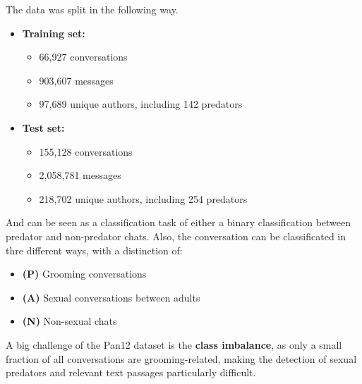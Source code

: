 The data was split in the following way.

\begin{itemize}
    \item \textbf{Training set:}
    \begin{itemize}
        \item 66{,}927 conversations
        \item 903{,}607 messages
        \item 97{,}689 unique authors, including 142 predators
    \end{itemize}
    \item \textbf{Test set:}
    \begin{itemize}
        \item 155{,}128 conversations
        \item 2{,}058{,}781 messages
        \item 218{,}702 unique authors, including 254 predators
    \end{itemize}
\end{itemize}

And can be seen as a classification task of either a binary classification between predator and non-predator chats. Also, the conversation can be classificated in thre different ways, with a distinction of:

\begin{itemize}
    \item \textbf{(P)} Grooming conversations
    \item \textbf{(A)} Sexual conversations between adults
    \item \textbf{(N)} Non-sexual chats
\end{itemize}

A big challenge of the Pan12 dataset is the \textbf{class imbalance}, as only a small fraction of all conversations are grooming-related, making the detection of sexual predators and relevant text passages particularly difficult.


